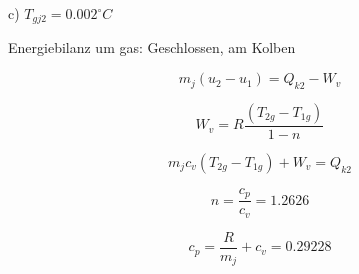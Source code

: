 c) \( T_{gj2} = 0.002^\circ C \)

Energiebilanz um gas: Geschlossen, am Kolben

\[
m_j (u_2 - u_1) = Q_{k2} - W_v
\]

\[
W_v = R \frac{(T_{2g} - T_{1g})}{1 - n}
\]

\[
m_j c_v (T_{2g} - T_{1g}) + W_v = Q_{k2}
\]

\[
n = \frac{c_p}{c_v} = 1.2626
\]

\[
c_p = \frac{R}{m_j} + c_v = 0.29228
\]